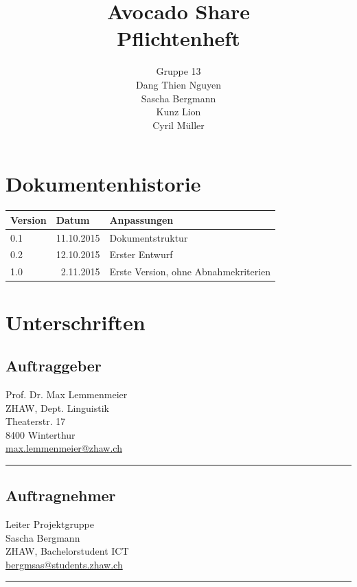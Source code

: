 \documentclass{avocado}
\title{\LARGE{Avocado Share}\\\large{Pflichtenheft}}
\author{%
    Gruppe 13 \\%
    \normalsize{Dang Thien Nguyen} \\%
    \normalsize{Sascha Bergmann} \\%
    \normalsize{Kunz Lion} \\%
    \normalsize{Cyril Müller} \\%
}
\newcommand{\mail}[1]{\href{mailto:#1}{#1}}
\begin{document}


\clearpage
\maketitle
\thispagestyle{empty}\clearpage

\section*{Dokumentenhistorie}
\begin{tabularx}{\linewidth}{|l|r|X|} \hline
Version & \multicolumn{1}{l|}{Datum} 			& Anpassungen \\ \hline
0.1      & 11.10.2015		& Dokumentstruktur \\ \hline
0.2	     & 12.10.2015       & Erster Entwurf  \\ \hline
1.0		 &  2.11.2015		& Erste Version, ohne Abnahmekriterien \\ \hline
\end{tabularx}
\vfill
\section*{Unterschriften}
\begin{minipage}[t][5cm][t]{0.45\linewidth}
\subsection*{Auftraggeber}
Prof. Dr. Max Lemmenmeier \\
ZHAW, Dept. Linguistik \\
Theaterstr. 17 \\
8400 Winterthur \\
\mail{max.lemmenmeier@zhaw.ch} \\
\vfill \hrule
\end{minipage} \hfill
\begin{minipage}[t][5cm][t]{0.45\linewidth}
\subsection*{Auftragnehmer}
Leiter Projektgruppe \\
Sascha Bergmann \\
ZHAW, Bachelorstudent ICT \\
\mail{bergmsas@students.zhaw.ch} \\
\vfill \hrule
\end{minipage} \\
\clearpage
\tableofcontents
\clearpage
\end{document}
